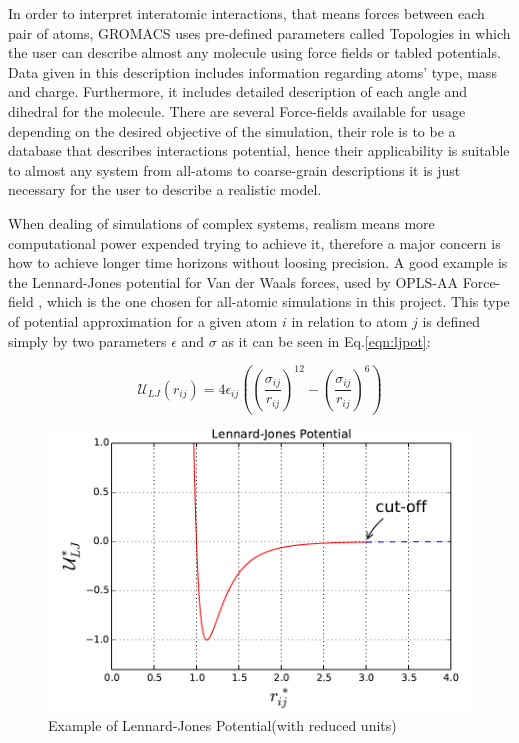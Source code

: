 \documentclass[10pt,a4paper,twoside]{article}
\begin{document}
 In order to interpret interatomic interactions, that means forces between each pair of atoms, GROMACS uses pre-defined parameters called Topologies in which the user can describe almost any molecule using force fields or tabled potentials. Data given in this description includes information regarding atoms' type, mass and charge. Furthermore, it includes detailed description of each angle and dihedral for the molecule. There are several Force-fields available for usage depending on the desired objective of the simulation, their role is to be a database that describes interactions potential, hence their applicability is suitable to almost any system from all-atoms to coarse-grain descriptions it is just necessary for the user to describe a realistic model.
 
  When dealing of simulations of complex systems, realism means more computational power expended trying to achieve it\cite{satoh}, therefore a major concern is how to achieve longer time horizons without loosing precision. A good example is the Lennard-Jones potential for Van der Waals forces, used by OPLS-AA Force-field \cite{opls}, which is the one chosen for all-atomic simulations in this project. This type of potential approximation for a given atom $i$ in relation to atom $j$ is defined simply by two parameters  $\epsilon$ and $\sigma$ as it can be seen in Eq.\ref{eqn:ljpot}:

\begin{equation}
\mathcal{U}_{LJ}(r_{ij}) = 4\epsilon_{ij}\left(\left( \dfrac{\sigma_{ij}}{r_{ij}}\right)^{12} - \left( \dfrac{\sigma_{ij}}{r_{ij}}\right)^6\right) 
\label{eqn:ljpot}
\end{equation}

 \begin{figure}[ht]
  \begin{center}
	\includegraphics[width=0.6 \textwidth]{./graphs/lj}
	\caption{Example of Lennard-Jones Potential(with reduced units)}
	\label{gfx:ljg}
	\end{center}
	\end{figure}
\end{document}
